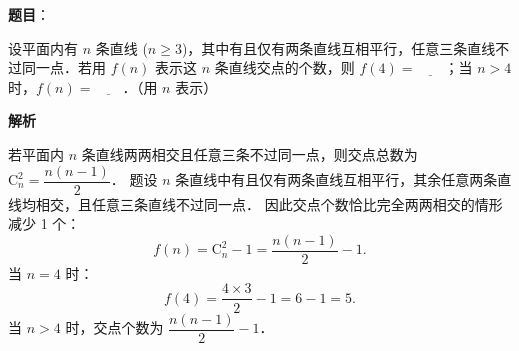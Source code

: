 \begin{answer}

\textbf{题目}：

设平面内有 $n$ 条直线 ($n \geqslant 3$)，其中有且仅有两条直线互相平行，任意三条直线不过同一点．若用 $f(n)$ 表示这 $n$ 条直线交点的个数，则 $f(4) = \underline{\qquad}$；当 $n > 4$ 时，$f(n) = \underline{\qquad}$．（用 $n$ 表示）

\textbf{解析}

若平面内 $n$ 条直线两两相交且任意三条不过同一点，则交点总数为 $\mathrm{C}_n^2 = \dfrac{n(n-1)}{2}$．
题设 $n$ 条直线中有且仅有两条直线互相平行，其余任意两条直线均相交，且任意三条直线不过同一点．
因此交点个数恰比完全两两相交的情形减少 1 个：
\nopagebreak[4]
\[
f(n) = \mathrm{C}_n^2 - 1 = \frac{n(n-1)}{2} - 1.
\]
当 $n = 4$ 时：
\nopagebreak[4]
\[
f(4) = \frac{4 \times 3}{2} - 1 = 6 - 1 = 5.
\]
当 $n > 4$ 时，交点个数为 $\dfrac{n(n-1)}{2} - 1$．


\end{answer}
